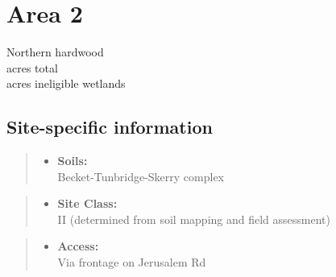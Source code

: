 \documentclass[]{tufte-handout}
\providecommand{\tightlist}{%
  \setlength{\itemsep}{0pt}\setlength{\parskip}{0pt}}
\begin{document}
\newpage

\section{Area 2}\label{area-2}

Northern hardwood\\
 acres total\\
 acres ineligible wetlands

\subsection{Site-specific
information}\label{site-specific-information-1}

\begin{quote}
\begin{itemize}
\tightlist
\item
  \textbf{Soils:}\\
  \indent\indent Becket-Tunbridge-Skerry complex
\end{itemize}
\end{quote}

\begin{quote}
\begin{itemize}
\tightlist
\item
  \textbf{Site Class:}\\
  \vspace{2pt} II (determined from soil mapping and field assessment)
\end{itemize}
\end{quote}

\begin{quote}
\begin{itemize}
\tightlist
\item
  \textbf{Access:}\\
  \vspace{2pt} Via frontage on Jerusalem Rd
\end{itemize}
\end{quote}
\end{document}
